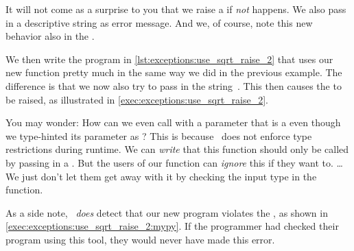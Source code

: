 It will not come as a surprise to you that we raise a  if \emph{not}  happens.
We also pass in a descriptive string as error message.
And we, of course, note this new behavior also in the .

We then write the program  in \cref{lst:exceptions:use_sqrt_raise_2} that uses our new  function pretty much in the same way we did in the previous example.
The difference is that we now also try to pass in the string~.
This then causes the  to be raised, as illustrated in \cref{exec:exceptions:use_sqrt_raise_2}.

You may wonder:
How can we even call  with a parameter that is a  even though we type-hinted its parameter as ?
This is because \python\ does not enforce type restrictions during runtime.
We can \emph{write} that this function should only be called by passing in a .
But the users of our function can \emph{ignore} this if they want to.
{\dots}We just don't let them get away with it by checking the input type in the function.

As a side note, \mypy\ \emph{does} detect that our new program  violates the , as shown in \cref{exec:exceptions:use_sqrt_raise_2:mypy}.
If the programmer had checked their program using this tool, they would never have made this error.

